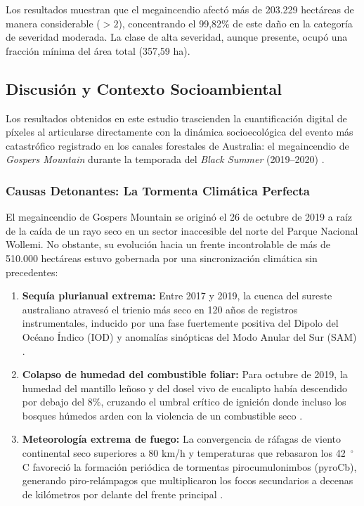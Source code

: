 \documentclass[12pt]{article}
\begin{document}
Los resultados muestran que el megaincendio afectó más de 203.229 hectáreas de manera considerable ($> 2$), concentrando el 99,82\% de este daño en la categoría de severidad moderada. La clase de alta severidad, aunque presente, ocupó una fracción mínima del área total (357,59 ha). 


\subsection{Discusión y Contexto Socioambiental }

Los resultados obtenidos en este estudio trascienden la cuantificación digital de píxeles al articularse directamente con la dinámica socioecológica del evento más catastrófico registrado en los canales forestales de Australia: el megaincendio de \textit{Gospers Mountain} durante la temporada del \textit{Black Summer} (2019--2020) \cite{boM2020blacksummer}.

\subsubsection{Causas Detonantes: La Tormenta Climática Perfecta}
El megaincendio de Gospers Mountain se originó el 26 de octubre de 2019 a raíz de la caída de un rayo seco en un sector inaccesible del norte del Parque Nacional Wollemi. No obstante, su evolución hacia un frente incontrolable de más de 510.000 hectáreas estuvo gobernada por una sincronización climática sin precedentes:
\begin{enumerate}
    \item \textbf{Sequía plurianual extrema:} Entre 2017 y 2019, la cuenca del sureste australiano atravesó el trienio más seco en 120 años de registros instrumentales, inducido por una fase fuertemente positiva del Dipolo del Océano Índico (IOD) y anomalías sinópticas del Modo Anular del Sur (SAM) \cite{abatzoglou2021anthropogenic}.
    \item \textbf{Colapso de humedad del combustible foliar:} Para octubre de 2019, la humedad del mantillo leñoso y del dosel vivo de eucalipto había descendido por debajo del 8\%, cruzando el umbral crítico de ignición donde incluso los bosques húmedos arden con la violencia de un combustible seco \cite{vanoldenborgh2021pathways}.
    \item \textbf{Meteorología extrema de fuego:} La convergencia de ráfagas de viento continental seco superiores a 80 km/h y temperaturas que rebasaron los 42~$^\circ$C favoreció la formación periódica de tormentas pirocumulonimbos (pyroCb), generando piro-relámpagos que multiplicaron los focos secundarios a decenas de kilómetros por delante del frente principal \cite{bowman2021pyrogeographic}.
\end{enumerate}
\end{document}
